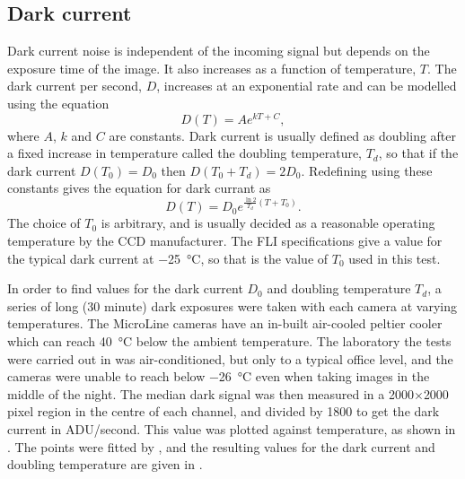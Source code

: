 \subsection{Dark current}
\label{sec:dc}
\begin{colsection}

Dark current noise is independent of the incoming signal but depends on the exposure time of the image. It also increases as a function of temperature, $T$. The dark current per second, $D$, increases at an exponential rate and can be modelled using the equation
%
\begin{equation}
    D(T) = Ae^{kT + C},
    \label{eq:dark_model}
\end{equation}
%
where $A$, $k$ and $C$ are constants. Dark current is usually defined as doubling after a fixed increase in temperature called the doubling temperature, $T_d$, so that if the dark current $D(T_0) = D_0$ then $D(T_0 + T_d) = 2D_0$. Redefining  using these constants gives the equation for dark currant as
%
\begin{equation}
    D(T) = D_0 e^{\frac{\ln2}{T_d}(T + T_0)}.
    \label{eq:dc}
\end{equation}
%
The choice of $T_0$ is arbitrary, and is usually decided as a reasonable operating temperature by the CCD manufacturer. The FLI specifications give a value for the typical dark current at \SI{-25}{\celsius}, so that is the value of $T_0$ used in this test.

In order to find values for the dark current $D_0$ and doubling temperature $T_d$, a series of long (30 minute) dark exposures were taken with each camera at varying temperatures. The MicroLine cameras have an in-built air-cooled peltier cooler which can reach \SI{40}{\celsius} below the ambient temperature. The laboratory the tests were carried out in was air-conditioned, but only to a typical office level, and the cameras were unable to reach below \SI{-26}{\celsius} even when taking images in the middle of the night. The median dark signal was then measured in a 2000$\times$2000 pixel region in the centre of each channel, and divided by 1800 to get the dark current in ADU/second. This value was plotted against temperature, as shown in . The points were fitted by , and the resulting values for the dark current and doubling temperature are given in .


\end{colsection}

